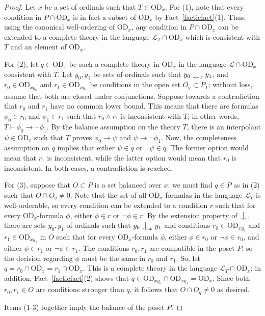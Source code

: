 \documentclass{article}
\newcommand{\forkindep}[1][]{%
  \mathrel{
    \mathop{
      \vcenter{
        \hbox{\oalign{\noalign{\kern-.3ex}\hfil$\vert$\hfil\cr
              \noalign{\kern-.7ex}
              $\smile$\cr\noalign{\kern-.3ex}}}
      }
    }\displaylimits_{#1}
  }
}
\newcommand{\vd}{\mathrm{OD}}
\theoremstyle{definition}
\begin{document}
\begin{proof}
	Let $x$ be a set of ordinals such that $T\in\vd_x$. For (1), note that every condition in $P\cap\vd_x$ is in fact a subset of $\vd_x$ by Fact~\ref{facticfact}(1). Thus, using the canonical well-ordering of $\vd_x$, any condition in $P\cap\vd_x$ can be extended to a complete theory in the language $\mathcal{L}_T\cap\vd_x$ which is consistent with $T$ and an element of $\vd_x$. 
	
	For (2), let $q\in\vd_x$ be such a complete theory in $\vd_x$ in the language $\mathcal{L}\cap\vd_x$ consistent with $T$. Let $y_0, y_1$ be sets of ordinals such that $y_0\forkindep[x] y_1$, and $r_0\in\vd_{xy_0}$ and $r_1\in\vd_{xy_1}$ be conditions in the open set $O_q\subset P_T$; without loss, assume that both are closed under conjunctions. Suppose towards a contradiction that $r_0$ and $r_1$ have no common lower bound. This means that there are formulas $\phi_0\in r_0$ and $\phi_1\in r_1$ such that $r_0\land r_1$ is inconsistent with $T$; in other words, $T\vdash\phi_0\to\lnot\phi_1$.  By the balance assumption on the theory $T$, there is an interpolant $\psi\in\vd_x$ such that $T$ proves $\phi_0\to\psi$ and $\psi\to\lnot\phi_1$. Now, the completeness assumption on $q$ implies that either $\psi\in q$ or $\lnot\psi\in q$. The former option would mean that $r_1$ is inconsistent, while the latter option would mean that $r_0$ is inconsistent. In both cases, a contradiction is reached.
	
	For (3), suppose that $O\subset P$ is a set balanced over $x$; we must find $q\in P$ as in (2) such that $O\cap O_q\neq 0$. Note that the set of all $\vd_x$ formulas in the language $\mathcal{L}_T$ is well-orderable, so every condition can be extended to a condition $r$ such that for every $\vd_x$-formula $\phi$, either $\phi\in r$ or $\lnot\phi\in r$. By the extension property of $\forkindep$, there are sets $y_0, y_1$ of ordinals such that $y_0\forkindep[x]y_1$ and conditions $r_0\in\vd_{xy_0}$ and $r_1\in\vd_{xy_1}$ in $O$ such that for every $\vd_x$-formula $\phi$, either $\phi\in r_0$ or $\lnot\phi\in r_0$, and  either $\phi\in r_1$ or $\lnot\phi\in r_1$. The conditions $r_0, r_1$ are compatible in the poset $P$, so the decision regarding $\phi$ must be the same in $r_0$ and $r_1$. So, let $q=r_0\cap\vd_x=r_1\cap\vd_x$. This is a complete theory in the language $\mathcal{L}_T\cap\vd_x$; in addition, Fact~\ref{facticfact}(2) shows that $q\in\vd_{xy_0}\cap\vd_{xy_1}=\vd_x$. Since both $r_0, r_1\in O$ are conditions stronger than $q$, it follows that $O\cap O_q\neq 0$ as desired.
	
	Items (1-3) together imply the balance of the poset $P$.  
\end{proof}
\end{document}
